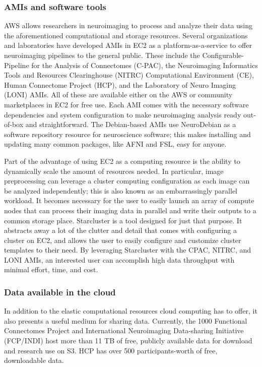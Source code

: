 \documentclass{frontiersSCNS} %
\begin{document}
\subsubsection{AMIs and software tools}
AWS allows researchers in neuroimaging to process and analyze their data using the aforementioned computational and storage resources. Several organizations and laboratories have developed AMIs in EC2 as a platform-as-a-service to offer neuroimaging pipelines to the general public. These include the Configurable-Pipeline for the Analysis of Connectomes (C-PAC), the Neuroimaging Informatics Tools and Resources Clearinghouse (NITRC) Computational Environment (CE), Human Connectome Project (HCP), and the Laboratory of Neuro Imaging (LONI) AMIs. All of these are available either on the AWS or community marketplaces in EC2 for free use. Each AMI comes with the necessary software dependencies and system configuration to make neuroimaging analysis ready out-of-box and straightforward. The Debian-based AMIs use NeuroDebian as a software repository resource for neuroscience software; this makes installing and updating many common packages, like AFNI and FSL, easy for anyone.


    Part of the advantage of using EC2 as a computing resource is the ability to dynamically scale the amount of resources needed. In particular, image preprocessing can leverage a cluster computing configuration as each image can be analyzed independently; this is also known as an embarrassingly parallel workload. It becomes necessary for the user to easily launch an array of compute nodes that can process their imaging data in parallel and write their outputs to a common storage place. Starcluster is a tool designed for just that purpose. It abstracts away a lot of the clutter and detail that comes with configuring a cluster on EC2, and allows the user to easily configure and customize cluster templates to their need. By leveraging Starcluster with the CPAC, NITRC, and LONI AMIs, an interested user can accomplish high data throughput with minimal effort, time, and cost.

\subsubsection{Data available in the cloud}
In addition to the elastic computational resources cloud computing has to offer, it also presents a useful medium for sharing data. Currently, the 1000 Functional Connectomes Project and International Neuroimaging Data-sharing Initiative (FCP/INDI) host more than 11 TB of free, publicly available data for download and research use on S3. HCP has over 500 participants-worth of free, downloadable data.
\end{document}
